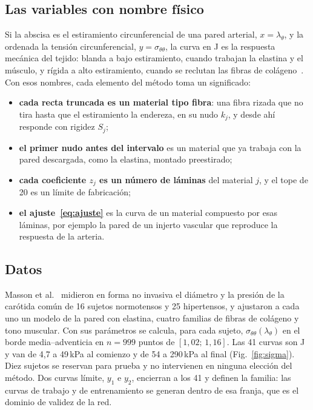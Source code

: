 \subsection{Las variables con nombre físico}
Si la abscisa es el estiramiento circunferencial de una pared arterial, $x=\lambda_\theta$, y la ordenada la tensión circunferencial, $y=\sigma_{\theta\theta}$, la curva en J es la respuesta mecánica del tejido: blanda a bajo estiramiento, cuando trabajan la elastina y el músculo, y rígida a alto estiramiento, cuando se reclutan las fibras de colágeno~\cite{holzapfel,humphrey}. Con esos nombres, cada elemento del método toma un significado:
\begin{itemize}
\item \textbf{cada recta truncada es un material tipo fibra}: una fibra rizada que no tira hasta que el estiramiento la endereza, en su nudo $k_j$, y desde ahí responde con rigidez $S_j$;
\item \textbf{el primer nudo antes del intervalo} es un material que ya trabaja con la pared descargada, como la elastina, montado preestirado;
\item \textbf{cada coeficiente $z_j$ es un número de láminas} del material $j$, y el tope de 20 es un límite de fabricación;
\item \textbf{el ajuste~\eqref{eq:ajuste}} es la curva de un material compuesto por esas láminas, por ejemplo la pared de un injerto vascular que reproduce la respuesta de la arteria.
\end{itemize}

\subsection{Datos}
Masson et al.~\cite{masson} midieron en forma no invasiva el diámetro y la presión de la carótida común de 16 sujetos normotensos y 25 hipertensos, y ajustaron a cada uno un modelo de la pared con elastina, cuatro familias de fibras de colágeno y tono muscular. Con sus parámetros se calcula, para cada sujeto, $\sigma_{\theta\theta}(\lambda_\theta)$ en el borde media--adventicia en $n=999$ puntos de $[1{,}02;\,1{,}16]$. Las 41 curvas son J y van de 4,7 a 49\,kPa al comienzo y de 54 a 290\,kPa al final (Fig.~\ref{fig:sigma}). Diez sujetos se reservan para prueba y no intervienen en ninguna elección del método. Dos curvas límite, $y_1$ e $y_2$, encierran a los 41 y definen la familia: las curvas de trabajo y de entrenamiento se generan dentro de esa franja, que es el dominio de validez de la red.

